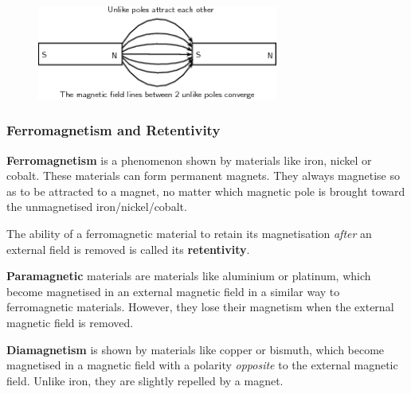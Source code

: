     \addtocounter{footnote}{-0}
    
        \par 
        \label{m37830*id129159}
          
    \setcounter{subfigure}{0}


	\begin{figure}[H] %
    \begin{center}
    \label{m37830*id129162!!!underscore!!!media}\label{m37830*id129162!!!underscore!!!printimage}\includegraphics[width=300px]{col11305.imgs/m37830_PG10C7_013.png} %
        
      \vspace{2pt}
    \vspace{.1in}
    
    \end{center}

 \end{figure}   

    \addtocounter{footnote}{-0}
    
        \par 
\label{m37830*secfhsst!!!underscore!!!id310}
            \subsubsection{  Ferromagnetism and Retentivity }
            \nopagebreak
            
        \label{m37830*id129174}\textbf{Ferromagnetism} is a
phenomenon shown by materials like iron, nickel or cobalt.
These materials can form permanent magnets. They always
magnetise so as to be attracted to a magnet, no matter which
magnetic pole is brought toward the unmagnetised iron/nickel/cobalt.\par 
        \label{m37830*id129186}The ability of a ferromagnetic material to retain its
magnetisation \textsl{after} an external field is removed is called its
\textbf{retentivity}.\par 
        \label{m37830*id129203}\textbf{Paramagnetic} materials are materials like
aluminium or platinum, which become magnetised in an external
magnetic field in a similar way to ferromagnetic materials. However, they
lose their magnetism when the external magnetic field is removed.\par 
        \label{m37830*id129214}\textbf{Diamagnetism} is shown by materials like copper or bismuth,
which become magnetised in a magnetic field with a polarity
\textsl{opposite} to the external magnetic field. Unlike iron, they are
slightly repelled by a magnet.
 \par 

